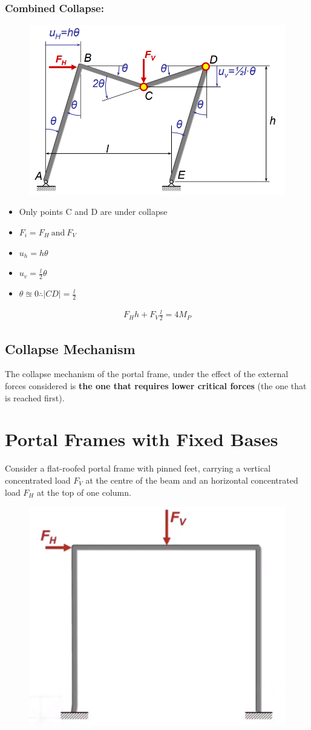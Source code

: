 \documentclass[class=report, crop=false, 12pt,a4paper]{standalone}
\begin{document}
\subsubsection{Combined Collapse:}
\begin{figure}[H]
  \centering
  \includegraphics[width = 0.6 \textwidth]{../img/beam44.PNG}
\end{figure}
\begin{itemize}
  \item Only points C and D are under collapse
  \item $F_i = F_H \ \text{and} \ F_V$
  \item $u_h = h\theta$
  \item $u_v = \frac{l}{2}\theta$
  \item $\theta \approxeq 0 \therefore |CD| = \frac{l}{2}$ 
\end{itemize}
\begin{gather}
  F_Hh + F_V\frac{l}{2} = 4M_P
\end{gather}
\subsection{Collapse Mechanism}
The collapse mechanism of the portal frame, under the effect of the external forces considered is \textbf{the one that requires lower critical forces} (the one that is reached first).
\section{Portal Frames with Fixed Bases}
Consider a flat-roofed portal frame with pinned feet, carrying a vertical concentrated load $F_V$ at the centre of the beam and an horizontal concentrated load $F_H$ at the top of one column.
\begin{figure}[H]
  \centering
  \includegraphics[width = 0.4 \textwidth]{../img/beam45.PNG}
\end{figure}
\end{document}
